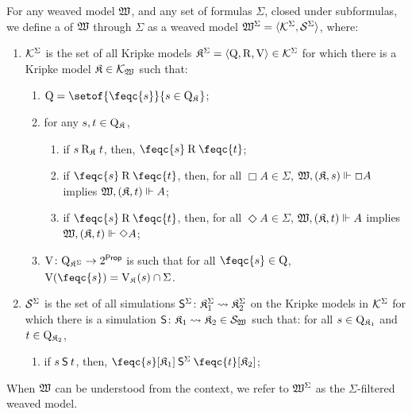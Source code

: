 \begin{definition}
    For any weaved model $\wmodel$, and any set of formulas $\Sigma$, closed under subformulas, we define a  of $\wmodel$ through $\Sigma$ as a weaved model $\fwmodel = \tuple{\Kfwm, \Sfwm}$, where:
    \begin{enumerate}[leftmargin=\parindent]
        \setlength{\itemsep}{0pt}
        \item $\Kfwm$ is the set of all Kripke models $\fmodel = \tuple{ \W, \R, \V} \in \Kfwm$ for which there is a Kripke model $\kmodel \in \Kwm$ such that:

            \begin{enumerate}
                \item $\W = \setof{\feqc{s}}{s \in \Wkm}$;
                \item for any $s, t \in \Wkm$,
                \begin{enumerate}
                    \item if $s \Rkm t$, then, $\feqc{s} \R \feqc{t}$;
                    \item if $\feqc{s} \R \feqc{t}$, then, for all $\Box A \in \Sigma$, $\wforces{\pair \kmodel s}{\Box A}$ implies $\wforces{\pair \kmodel t}{A}$;
                    \item if $\feqc{s} \R \feqc{t}$, then, for all $\Diamond A \in \Sigma$, $\wforces{\pair \kmodel t}{A}$ implies $\wforces{\pair \kmodel t}{\Diamond A}$;
                \end{enumerate}
                \item $\V \colon \Wof{\fmodel} \to 2^{\props}$ is such that for all $\feqc{s} \in \W$, $\V(\feqc{s}) = \Vkm(s) \cap \Sigma$.
            \end{enumerate}

        \item $\Sfwm$ is the set of all simulations $\fSim\colon \fmodel[1] \fsim \fmodel[2]$ on the Kripke models in $\Kfwm$ for which there is a simulation $\Sim \colon \kmodel_1 \fsim \kmodel_2 \in \Swm$ such that: for all $s \in \Wkm[1]$ and $t \in \Wkm[2]$,
            
            \begin{enumerate}
                \item if $s \Sim t$, then, $\feqc{s}[{\kmodel_1}] \fSim \feqc{t}[{\kmodel_2}]$;
            \end{enumerate}
    \end{enumerate}
    When $\wmodel$ can be understood from the context, we refer to $\fwmodel$ as the $\Sigma$-filtered weaved model.
\end{definition}

